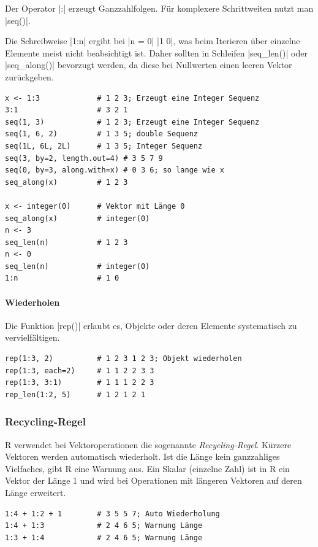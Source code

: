 \documentclass[10pt,twocolumn]{scrartcl}
\renewcommand{\lstinline}{\mycoloredinline}
\begin{document}
Der Operator \lstinline|:| erzeugt Ganzzahlfolgen. Für komplexere Schrittweiten nutzt man \lstinline|seq()|. 

Die Schreibweise \lstinline|1:n| ergibt bei \lstinline|n = 0| \lstinline|1 0|, was beim Iterieren über einzelne Elemente meist nicht beabsichtigt ist. Daher sollten in Schleifen \lstinline|seq_len()| oder \lstinline|seq_along()| bevorzugt werden, da diese bei Nullwerten einen leeren Vektor zurückgeben.

\begin{lstlisting}
x <- 1:3             # 1 2 3; Erzeugt eine Integer Sequenz
3:1                  # 3 2 1
seq(1, 3)            # 1 2 3; Erzeugt eine Integer Sequenz
seq(1, 6, 2)         # 1 3 5; double Sequenz
seq(1L, 6L, 2L)      # 1 3 5; Integer Sequenz
seq(3, by=2, length.out=4) # 3 5 7 9
seq(0, by=3, along.with=x) # 0 3 6; so lange wie x
seq_along(x)         # 1 2 3

x <- integer(0)      # Vektor mit Länge 0
seq_along(x)         # integer(0)
n <- 3
seq_len(n)           # 1 2 3
n <- 0
seq_len(n)           # integer(0)
1:n                  # 1 0
\end{lstlisting}

\paragraph{Wiederholen}

Die Funktion \lstinline|rep()| erlaubt es, Objekte oder deren Elemente systematisch zu vervielfältigen.

\begin{lstlisting}
rep(1:3, 2)          # 1 2 3 1 2 3; Objekt wiederholen
rep(1:3, each=2)     # 1 1 2 2 3 3
rep(1:3, 3:1)        # 1 1 1 2 2 3
rep_len(1:2, 5)      # 1 2 1 2 1
\end{lstlisting}


\subsubsection{Recycling-Regel}

R verwendet bei Vektoroperationen die sogenannte \emph{Recycling-Regel}. Kürzere Vektoren werden automatisch wiederholt. Ist die Länge kein ganzzahliges Vielfaches, gibt R eine Warnung aus. Ein Skalar (einzelne Zahl) ist in R ein Vektor der Länge 1 und wird bei Operationen mit längeren Vektoren auf deren Länge erweitert.

\begin{lstlisting}
1:4 + 1:2 + 1        # 3 5 5 7; Auto Wiederholung
1:4 + 1:3            # 2 4 6 5; Warnung Länge
1:3 + 1:4            # 2 4 6 5; Warnung Länge
\end{lstlisting}
\end{document}
